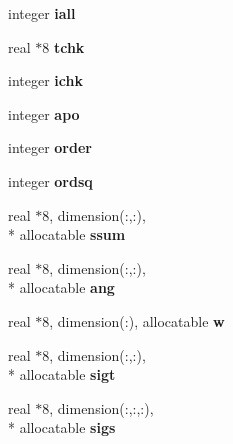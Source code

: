 \begin{DoxyCompactItemize}
\item 
\hypertarget{classinvar_ac94f06afb54503fdcfb76aa3271f150f}{integer {\bfseries iall}}\label{classinvar_ac94f06afb54503fdcfb76aa3271f150f}

\item 
\hypertarget{classinvar_ae05f644150f4a61fb93c066519e16253}{real $\ast$8 {\bfseries tchk}}\label{classinvar_ae05f644150f4a61fb93c066519e16253}

\item 
\hypertarget{classinvar_ab341cd3ab4c4d39818e4a67f24b4f8db}{integer {\bfseries ichk}}\label{classinvar_ab341cd3ab4c4d39818e4a67f24b4f8db}

\item 
\hypertarget{classinvar_ad343382de87380b003d3cb1956f9d7f6}{integer {\bfseries apo}}\label{classinvar_ad343382de87380b003d3cb1956f9d7f6}

\item 
\hypertarget{classinvar_a61de2c440600d5d2ac76813668f8e822}{integer {\bfseries order}}\label{classinvar_a61de2c440600d5d2ac76813668f8e822}

\item 
\hypertarget{classinvar_a094a6bb02520f1985afcbd316bddfc9a}{integer {\bfseries ordsq}}\label{classinvar_a094a6bb02520f1985afcbd316bddfc9a}

\item 
\hypertarget{classinvar_aa99f29b7ae37d212b885d6a632d36baa}{real $\ast$8, dimension(\+:,\+:), \\*
allocatable {\bfseries ssum}}\label{classinvar_aa99f29b7ae37d212b885d6a632d36baa}

\item 
\hypertarget{classinvar_a42fc94342b9f9064432aca52d36a99e9}{real $\ast$8, dimension(\+:,\+:), \\*
allocatable {\bfseries ang}}\label{classinvar_a42fc94342b9f9064432aca52d36a99e9}

\item 
\hypertarget{classinvar_a3fe98ed23b01e69ed2a26e168daf3f86}{real $\ast$8, dimension(\+:), allocatable {\bfseries w}}\label{classinvar_a3fe98ed23b01e69ed2a26e168daf3f86}

\item 
\hypertarget{classinvar_a4a9f22ce179e94bf9c3fe258faae5b58}{real $\ast$8, dimension(\+:,\+:), \\*
allocatable {\bfseries sigt}}\label{classinvar_a4a9f22ce179e94bf9c3fe258faae5b58}

\item 
\hypertarget{classinvar_a9955ce132cdd8e0c1057c56696cdabbb}{real $\ast$8, dimension(\+:,\+:,\+:), \\*
allocatable {\bfseries sigs}}\label{classinvar_a9955ce132cdd8e0c1057c56696cdabbb}


\end{DoxyCompactItemize}
